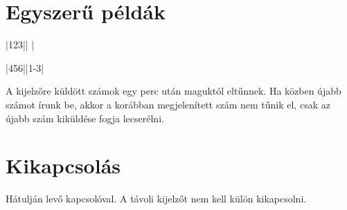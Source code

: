 \documentclass{article}
\begin{document}
\section*{Egyszerű példák}

   \keys{ } \hfill {}|123||   |

     \keys{-}  \keys{ } \hfill {}|456||1-3|


A kijelzőre küldött számok egy perc után maguktól eltűnnek. Ha közben újabb számot írunk be, akkor a korábban megjelenített szám nem tűnik el, csak az újabb szám kiküldése fogja lecserélni.

\section*{Kikapcsolás}

Hátulján levő kapcsolóval. A távoli kijelzőt nem kell külön kikapcsolni.


\end{document}
